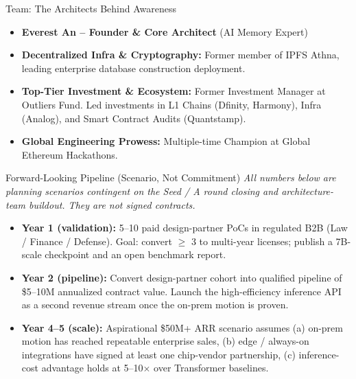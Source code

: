 ﻿\documentclass[aspectratio=169, 10pt]{beamer}
\begin{document}
\begin{frame}{Team: The Architects Behind Awareness}
\begin{itemize}
    \item \textbf{Everest An -- Founder \& Core Architect} (AI Memory Expert)
    \vspace{0.5em}
    \item \textbf{Decentralized Infra \& Cryptography:} Former member of IPFS Athna, leading enterprise database construction deployment.
    \item \textbf{Top-Tier Investment \& Ecosystem:} Former Investment Manager at Outliers Fund. Led investments in L1 Chains (Dfinity, Harmony), Infra (Analog), and Smart Contract Audits (Quantstamp).
    \item \textbf{Global Engineering Prowess:} Multiple-time Champion at Global Ethereum Hackathons.
\end{itemize}
\end{frame}

\begin{frame}{Forward-Looking Pipeline (Scenario, Not Commitment)}
\footnotesize
\textit{All numbers below are planning scenarios contingent on the Seed / A round closing and architecture-team buildout. They are not signed contracts.}
\begin{itemize}\itemsep=0.3em
    \item \textbf{Year 1 (validation):} 5--10 paid design-partner PoCs in regulated B2B (Law / Finance / Defense). Goal: convert $\geq$ 3 to multi-year licenses; publish a 7B-scale checkpoint and an open benchmark report.
    \item \textbf{Year 2 (pipeline):} Convert design-partner cohort into qualified pipeline of \$5--10M annualized contract value. Launch the high-efficiency inference API as a second revenue stream once the on-prem motion is proven.
    \item \textbf{Year 4--5 (scale):} Aspirational \$50M+ ARR scenario assumes (a) on-prem motion has reached repeatable enterprise sales, (b) edge / always-on integrations have signed at least one chip-vendor partnership, (c) inference-cost advantage holds at 5--10$\times$ over Transformer baselines.
\end{itemize}
\end{frame}
\end{document}
